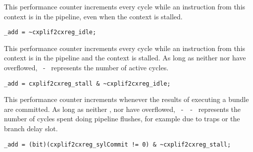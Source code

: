 
This performance counter increments every cycle while an instruction from this 
context is in the pipeline, even when the context is stalled.

\implementation{}
\begin{lstlisting}
_add = ~cxplif2cxreg_idle;
\end{lstlisting}


This performance counter increments every cycle while an instruction from this 
context is in the pipeline and the context is stalled. As long as neither 
 nor  have overflowed, ~-~ 
represents the number of active cycles.

\implementation{}
\begin{lstlisting}
_add = cxplif2cxreg_stall & ~cxplif2cxreg_idle;
\end{lstlisting}


This performance counter increments whenever the results of executing a bundle 
are committed. As long as neither ,  nor  have 
overflowed, ~-~~-~ represents the number of 
cycles spent doing pipeline flushes, for example due to traps or the branch 
delay slot.

\implementation{}
\begin{lstlisting}
_add = (bit)(cxplif2cxreg_sylCommit != 0) & ~cxplif2cxreg_stall;
\end{lstlisting}


